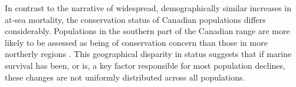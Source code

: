 \documentclass[12pt]{article}
\begin{document}


In contrast to the narrative of widespread, demographically similar increases
in at-sea mortality, the conservation status of Canadian populations differs
considerably. Populations in the southern part of the Canadian range are more
likely to be assessed as being of conservation concern than those in more
northerly regions \citep{Cosewic2010}. This geographical disparity in status
suggests that if marine survival has been, or is, a key factor responsible for
most population declines, these changes are not uniformly distributed across
all populations. 


\end{document}
